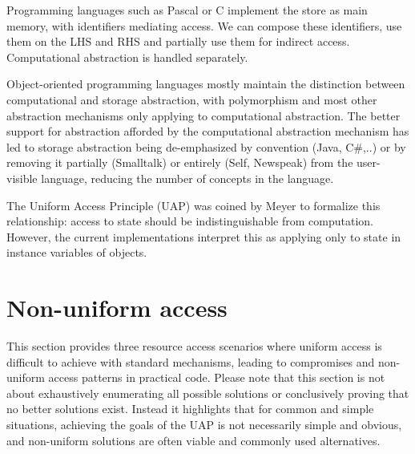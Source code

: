 \documentclass[preprint]{sigplanconf}
\begin{document}
Programming languages such as Pascal or C implement the store as main memory, with
identifiers mediating access.  We can compose these identifiers, use them on the LHS and RHS
and partially use them for indirect access.  Computational abstraction is handled separately.

Object-oriented programming languages mostly maintain the distinction between computational
and storage abstraction, with polymorphism and most other abstraction mechanisms only
applying to computational abstraction.  The better support for abstraction afforded by 
the computational abstraction mechanism has led to storage abstraction being 
de-emphasized by convention (Java, C\#,..) or by removing it partially (Smalltalk) or 
entirely (Self, Newspeak) from the user-visible language, reducing the number
of concepts in the language.  



The Uniform Access Principle (UAP) was coined by Meyer to formalize this relationship:  
access to state should be indistinguishable from computation.  However, the current
implementations interpret this as applying only to state in instance variables of objects.











\section{Non-uniform access}
\label{nonuniform}

This section provides three resource access scenarios where uniform access is difficult to achieve
with standard mechanisms, leading to compromises and non-uniform access patterns in practical
code.  Please note that this section is not about exhaustively enumerating all possible solutions
or conclusively proving that no better solutions exist. Instead it highlights that for common and
simple situations, achieving the goals of the UAP is not necessarily simple and obvious, and
non-uniform solutions are often viable and commonly used alternatives.
\end{document}
